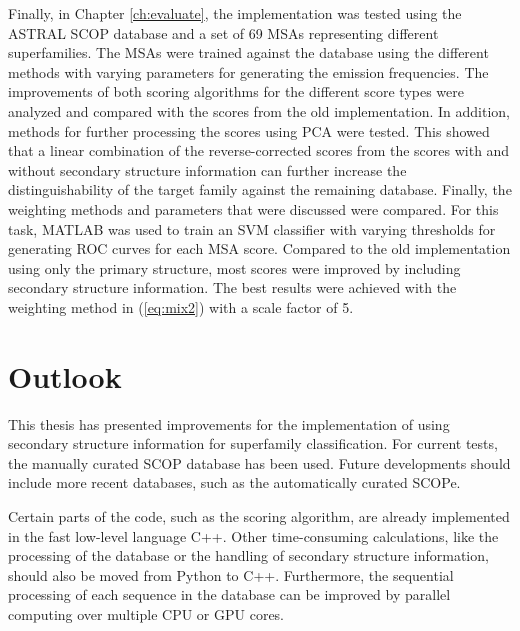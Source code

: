 Finally, in Chapter \ref{ch:evaluate}, the implementation was tested using the ASTRAL \ac{SCOP} database and a set of 69 \acp{MSA} representing different superfamilies. The \acp{MSA} were trained against the database using the different methods with varying parameters for generating the emission frequencies. The improvements of both scoring algorithms for the different score types were analyzed and compared with the scores from the old implementation. In addition, methods for further processing the scores using \ac{PCA} were tested. This showed that a linear combination of the reverse-corrected scores from the scores with and without secondary structure information can further increase the distinguishability of the target family against the remaining database. Finally, the weighting methods and parameters that were discussed were compared. For this task, MATLAB was used to train an \ac{SVM} classifier with varying thresholds for generating \ac{ROC} curves for each \ac{MSA} score. Compared to the old implementation using only the primary structure, most scores were improved by including secondary structure information. The best results were achieved with the weighting method in (\ref{eq:mix2}) with a scale factor of 5.



\section{Outlook}


This thesis has presented improvements for the implementation of using secondary structure information for superfamily classification. For current tests, the manually curated \ac{SCOP} database has been used. Future developments should include more recent databases, such as the automatically curated \ac{SCOPe}.


Certain parts of the code, such as the scoring algorithm, are already implemented in the fast low-level language C++. Other time-consuming calculations, like the processing of the database or the handling of secondary structure information, should also be moved from Python to C++. 
Furthermore, the sequential processing of each sequence in the database can be improved by parallel computing over multiple CPU or GPU cores.